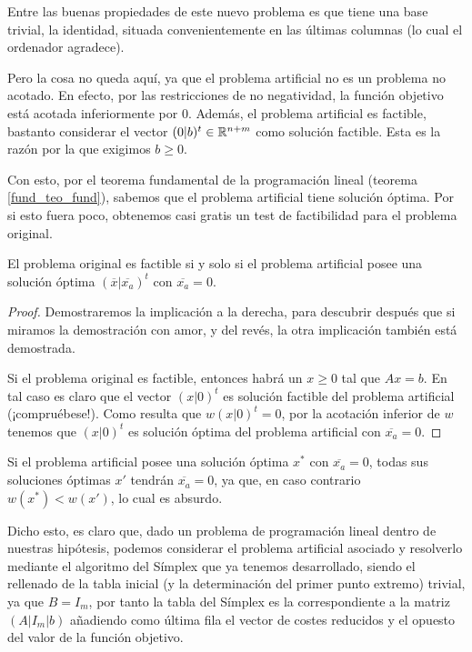 Entre las buenas propiedades de este nuevo problema es que tiene una base trivial, la identidad, situada convenientemente en las últimas columnas (lo cual el ordenador agradece).

Pero la cosa no queda aquí, ya que el problema artificial no es un problema no acotado. En efecto, por las restricciones de no negatividad, la función objetivo está acotada inferiormente por $0$. Además, el problema artificial es factible, bastanto considerar el vector $(0|b)^t\in\mathbb{R}^{n+m}$ como solución factible. Esta es la razón por la que exigimos $b\geq 0$.

Con esto, por el teorema fundamental de la programación lineal (teorema \ref{fund_teo_fund}), sabemos que el problema artificial tiene solución óptima. Por si esto fuera poco, obtenemos casi gratis un test de factibilidad para el problema original.
\begin{lem}
	\label{simp_lem_testFacti}
	El problema original es factible si y solo si el problema artificial posee una solución óptima $(\overline{x}|\overline{x_a})^t$ con $\overline{x_a}=0$.
\end{lem}
\begin{proof}
	Demostraremos la implicación a la derecha, para descubrir después que si miramos la demostración con amor, y del revés, la otra implicación también está demostrada.
	
	Si el problema original es factible, entonces habrá un $x\geq 0$ tal que $Ax=b$. En tal caso es claro que el vector $(x|0)^t$ es solución factible del problema artificial (¡compruébese!). Como resulta que $w(x|0)^t=0$, por la acotación inferior de $w$ tenemos que $(x|0)^t$ es solución óptima del problema artificial con $\overline{x_a}=0$.
\end{proof}
\begin{obs}[Sutileza]
	Si el problema artificial posee una solución óptima $x^*$ con $\overline{x_a}=0$, todas sus soluciones óptimas $x'$ tendrán $\overline{x_a}=0$, ya que, en caso contrario $w(x^*)<w(x')$, lo cual es absurdo. 
\end{obs}
Dicho esto, es claro que, dado un problema de programación lineal dentro de nuestras hipótesis, podemos considerar el problema artificial asociado y resolverlo mediante el algoritmo del Símplex que ya tenemos desarrollado, siendo el rellenado de la tabla inicial (y la determinación del primer punto extremo) trivial, ya que $B=I_m$, por tanto la tabla del Símplex es la correspondiente a la matriz $(A|I_m|b)$ añadiendo como última fila el vector de costes reducidos y el opuesto del valor de la función objetivo.

